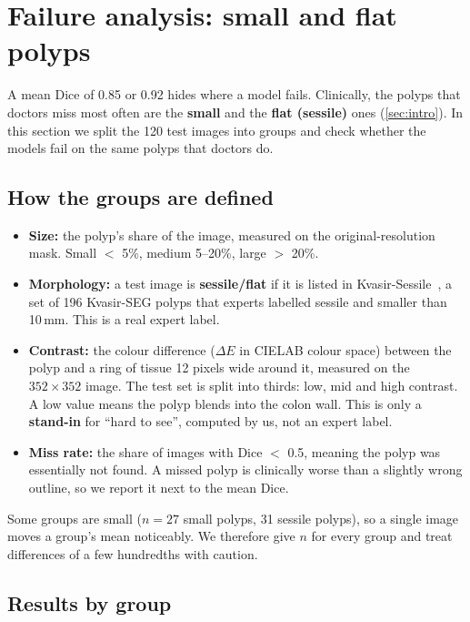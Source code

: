 \section{Failure analysis: small and flat polyps}
\label{sec:failure}
A mean Dice of 0.85 or 0.92 hides where a model fails. Clinically, the polyps that doctors miss most often are the
\textbf{small} and the \textbf{flat (sessile)} ones (\cref{sec:intro}). In this section we split the 120 test images into groups
and check whether the models fail on the same polyps that doctors do.

\subsection{How the groups are defined}
\label{sec:groups-def}
\begin{itemize}
  \item \textbf{Size:} the polyp's share of the image, measured on the original-resolution mask.
        Small $<$ 5\%, medium 5--20\%, large $>$ 20\%.
  \item \textbf{Morphology:} a test image is \textbf{sessile/flat} if it is listed in Kvasir-Sessile~\cite{jha2021sessile}, a set of
        196 Kvasir-SEG polyps that experts labelled sessile and smaller than 10\,mm. This is a real expert label.
  \item \textbf{Contrast:} the colour difference ($\Delta E$ in CIELAB colour space) between the polyp and a ring of tissue
        12 pixels wide around it, measured on the $352\times352$ image. The test set is split into thirds: low, mid and high contrast. A low value means the
        polyp blends into the colon wall. This is only a \textbf{stand-in} for ``hard to see'', computed by us, not an expert label.
  \item \textbf{Miss rate:} the share of images with Dice $<$ 0.5, meaning the polyp was essentially not found. A missed polyp
        is clinically worse than a slightly wrong outline, so we report it next to the mean Dice.
\end{itemize}
Some groups are small ($n = 27$ small polyps, 31 sessile polyps), so a single image moves a group's mean noticeably.
We therefore give $n$ for every group and treat differences of a few hundredths with caution.

\subsection{Results by group}
\label{sec:groups}

